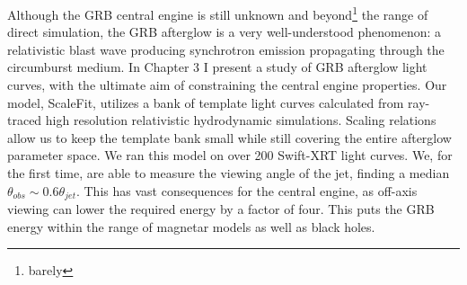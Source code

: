 Although the GRB central engine is still unknown and beyond\footnote{barely} the range of direct simulation, the GRB afterglow is a very well-understood phenomenon: a relativistic blast wave producing synchrotron emission propagating through the circumburst medium.  In Chapter 3 I present a study of GRB afterglow light curves, with the ultimate aim of constraining the central engine properties.  Our model, ScaleFit, utilizes a bank of template light curves calculated from ray-traced high resolution relativistic hydrodynamic simulations.  Scaling relations allow us to keep the template bank small while still covering the entire afterglow parameter space.  We ran this model on over 200 Swift-XRT light curves.  We, for the first time, are able to measure the viewing angle of the jet, finding a median $\theta_{obs} \sim 0.6 \theta_{jet}$.  This has vast consequences for the central engine, as off-axis viewing can lower the required energy by a factor of four.  This puts the GRB energy within the range of magnetar models as well as black holes.




%
%
%
%

